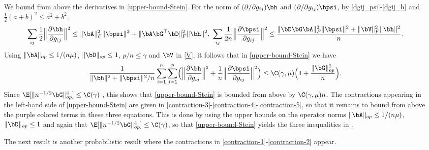 \documentclass{colt2022} %
\renewenvironment{proof}[1][]
{
    \begin{newproof}
    \ifthenelse{\equal{#1}{}}{ }{\textbf{(#1) }}%
}{
    \end{newproof}
}
\numberwithin{equation}{section}
\begin{document}
\begin{proof}
    We bound from above the derivatives in \eqref{upper-bound-Stein}.
    For the norm of $(\partial/\partial g_{ij})\bh$ and
    $(\partial/\partial g_{ij})\bpsi$,
    by \eqref{dgij_psi}-\eqref{dgij_h} and $\frac 1 2(a+b)^2\le a^2+b^2$,
    \begin{align*}
        \sum_{ij}
        \frac12
        \Big\|
        \frac{\partial \bh}{\partial g_{ij}}
        \Big\|^2
        \le
        \|\bA\|_F^2 \|\bpsi\|^2
        + \|\bA\bG^\top\bD\|_F^2 \|\bh\|^2,
        ~
        \sum_{ij}
        \frac1{2n}
        \Big\|
        \frac{\partial \bpsi}{\partial g_{ij}}
        \Big\|^2
        \le
        \frac{\|\bD\bG\bA\|_F^2\|\bpsi\|^2 + \|\bV\|_F^2 \|\bh\|^2}{n}
        .
    \end{align*}
    Using $\|\bA\|_{op}\le 1/(n\mu)$, $\|\bD\|_{op}\le 1$, $p/n\le \gamma$
    and $\bV$ in \eqref{V},
    it follows that in \eqref{upper-bound-Stein} we have
    \begin{equation}
    \frac{1}{\|\bh\|^2 + \|\bpsi\|^2/n}
    \sum_{i=1}^n
    \sum_{j=1}^p
        \Bigl(
        \Big\|
        \frac{\partial \bh}{\partial g_{ij}}
        \Big\|^2
        +
        \frac1n
        \Big\|
        \frac{\partial \bpsi}{\partial g_{ij}}
        \Big\|^2
        \Bigr)
    \le
    \C(\gamma,\mu)
    \Bigl(1+  \frac{\|\bG\|_{op}^2}{n} \Bigr).
    \label{Xi-upper-bound}
    \end{equation}
    Since $\E[\|n^{-1/2}\bG\|_{op}^4]\le \C(\gamma)$
    \cite[Theorem II.13]{davidson2001local},
    this shows that \eqref{upper-bound-Stein} is bounded from above
    by $\C(\gamma,\mu) n$. The contractions appearing in
    the left-hand side of \eqref{upper-bound-Stein} are given in
    \eqref{contraction-3}-\eqref{contraction-4}-\eqref{contraction-5},
    so that it remains to bound from above the purple colored terms
    in these three equations. This is done by using the
    upper bounds on the operator norms
    $\|\bA\|_{op}\le 1/(n\mu)$, $\|\bD\|_{op}\le 1$
    and again that $\E[\|n^{-1/2}\bG\|_{op}^4]\le \C(\gamma)$,
    so that \eqref{upper-bound-Stein}
    yields the three inequalities in .
\end{proof}


The next result is another probabilistic result
where the contractions in \eqref{contraction-1}-\eqref{contraction-2}
appear.
\end{document}
